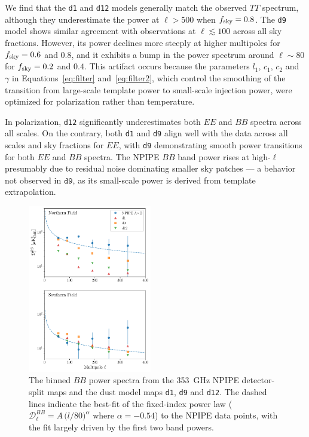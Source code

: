 \documentclass[twocolumn]{aastex631}
\begin{document}
We find that the \texttt{d1} and \texttt{d12} models generally match the observed $TT$ spectrum, although they underestimate the power at $\ell > 500$ when $f_{\rm sky} = 0.8$. The \texttt{d9} model shows similar agreement with observations at $\ell \lesssim 100$ across all sky fractions. However, its power declines more steeply at higher multipoles for $f_{\rm sky} = 0.6$ and $0.8$, and it exhibits a bump in the power spectrum around $\ell \sim 80$ for $f_{\rm sky} = 0.2$ and $0.4$. This artifact occurs because the parameters $l_1$, $c_1$, $c_2$ and $\gamma$ in Equations~\eqref{eq:filter} and~\eqref{eq:filter2}, which control the smoothing of the transition from large-scale template power to small-scale injection power, were optimized for polarization rather than temperature. 

In polarization, \texttt{d12} significantly underestimates both $EE$ and $BB$ spectra across all scales. On the contrary, both \texttt{d1} and \texttt{d9} align well with the data across all scales and sky fractions for $EE$, with \texttt{d9} demonstrating smooth power transitions for both $EE$ and $BB$ spectra. The NPIPE $BB$ band power rises at high-$\ell$ presumably due to residual noise dominating smaller sky patches --- a behavior not observed in $\texttt{d9}$, as its small-scale power is derived from template extrapolation. 

\begin{figure}
    \centering
    \includegraphics[width=0.48\textwidth]{figures/smallfield_power.pdf}
    \caption{The binned $BB$ power spectra from the 353~GHz NPIPE detector-split maps and the dust model maps \texttt{d1}, \texttt{d9} and \texttt{d12}. The dashed lines indicate the best-fit of the fixed-index power law ($\mathcal{D}_\ell^{BB} = A \, \big( l/80 \big)^{\alpha}$ where $\alpha = -0.54$) to the NPIPE data points, with the fit largely driven by the first two band powers.}
    \label{fig:smallfield_power}
\end{figure}
\end{document}
